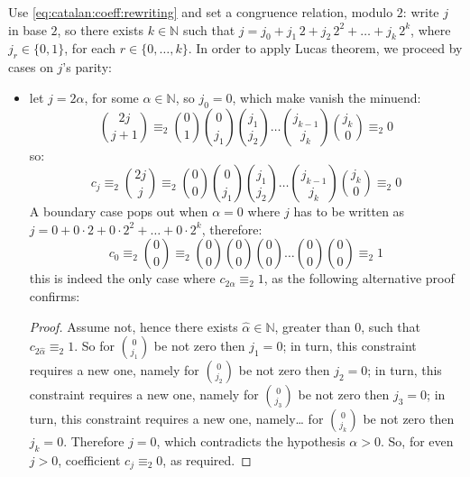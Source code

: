 Use \autoref{eq:catalan:coeff:rewriting}
and set a congruence relation, modulo $2$: write $j$ in base $2$, 
so there exists $k\in\mathbb{N}$ such that 
$j=j_{0} + j_{1}\,2 + j_{2}\,2^{2} + \ldots + j_{k}\,2^{k}$, where
$j_{r}\in\lbrace0,1\rbrace$, for each $r\in\lbrace0,\ldots,k\rbrace$. 
In order to apply Lucas theorem, we proceed by cases on $j$'s parity:
\begin{itemize}
    \item let $j=2\alpha$, for some $\alpha\in\mathbb{N}$, so $j_{0}=0$,
        which make vanish the minuend:
        \begin{displaymath}
            {{2j}\choose{j+1}}
            \equiv_{2} {{0}\choose{1}}{{0}\choose{j_{1}}}{{j_{1}}\choose{j_{2}}}
                \ldots{{j_{k-1}}\choose{j_{k}}}{{j_{k}}\choose{0}}\equiv_{2}0
        \end{displaymath}
        so:
        \begin{displaymath}
            c_{j}\equiv_{2}{{2j}\choose{j}}
            \equiv_{2} {{0}\choose{0}}{{0}\choose{j_{1}}}{{j_{1}}\choose{j_{2}}}
                \ldots{{j_{k-1}}\choose{j_{k}}}{{j_{k}}\choose{0}}\equiv_{2}0
        \end{displaymath}
        A boundary case pops out when $\alpha=0$ where $j$ has to be written as 
        $j=0 + 0\cdot2 + 0\cdot2^{2} + \ldots + 0\cdot2^{k}$, therefore:
        \begin{displaymath}
            c_{0}\equiv_{2}{{0}\choose{0}}
            \equiv_{2} {{0}\choose{0}}{{0}\choose{0}}{{0}\choose{0}}
                \ldots{{0}\choose{0}}{{0}\choose{0}}\equiv_{2}1
        \end{displaymath}
        this is indeed the only case where $c_{2\alpha} \equiv_{2}1$,
        as the following alternative proof confirms:
        \begin{proof}
            Assume not, hence there exists $\hat{\alpha}\in\mathbb{N}$, greater than $0$,
            such that $c_{2\hat{\alpha}} \equiv_{2}1$. So for ${{0}\choose{j_{1}}}$
            be not zero then $j_{1}=0$; in turn, this constraint requires a new one, namely
            for ${{0}\choose{j_{2}}}$ be not zero then $j_{2}=0$; 
            in turn, this constraint requires a new one, namely
            for ${{0}\choose{j_{3}}}$ be not zero then $j_{3}=0$; 
            in turn, this constraint requires a new one, namely\ldots
            for ${{0}\choose{j_{k}}}$ be not zero then $j_{k}=0$.
            Therefore $j=0$, which contradicts the hypothesis $\alpha>0$. So,
            for even $j > 0$, coefficient $c_{j}\equiv_{2}0$, as required.
        \end{proof}


\end{itemize}

